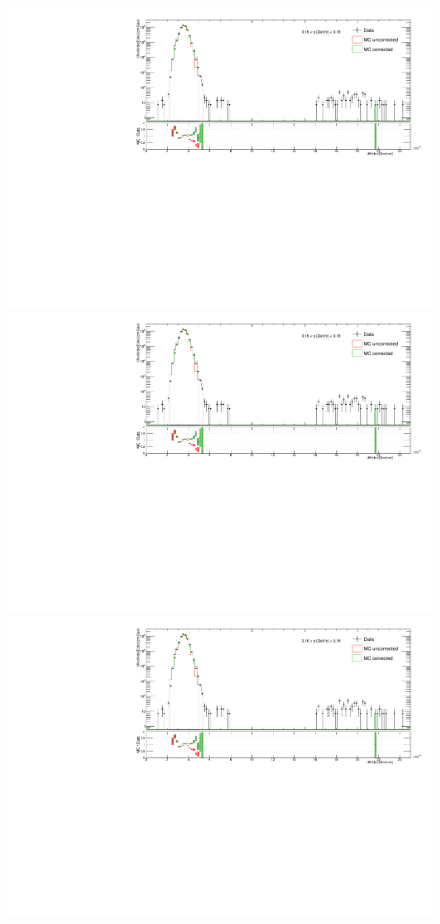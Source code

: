 \begin{figure}[hb]
\centering
\parbox{0.495\textwidth}{
  \centering
  \includegraphics[width=\linewidth,page=4]{graphics/corrections/dEdx_DataVsMC.pdf}\\
  \includegraphics[width=\linewidth,page=14]{graphics/corrections/dEdx_DataVsMC.pdf}\\
  \includegraphics[width=\linewidth,page=24]{graphics/corrections/dEdx_DataVsMC.pdf}\\
}
\end{figure}
